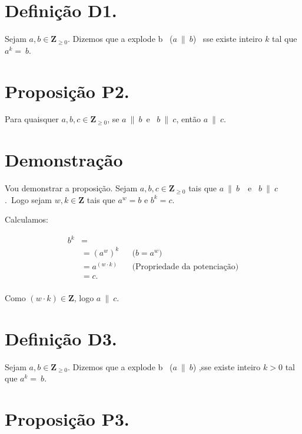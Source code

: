 \documentclass{article}
\def \aexpb{{$a\ \| \ b$}}
\def \bexpc{{$b\ \| \ c$}}
\def \aexpc{{$a\ \| \ c$}}
\begin{document}
 \newpage

 
\section{Definição D1.}
Sejam $a, b \in \mathbf Z _{\ge 0}$. Dizemos que a explode b \ (\aexpb) \ sse existe inteiro $k$ tal que $a^k=\ b$.

\section{Proposição P2.}

Para quaisquer $a,b,c \in \mathbf Z _{\ge 0}$, se \aexpb \ e  \ \bexpc , então \aexpc{}.


\section{Demonstração}

Vou demonstrar a proposição.\newline
Sejam $a,b,c \in \mathbf Z _{\ge 0}$ tais que \aexpb \ \ e \ \bexpc.\ Logo sejam $w,k \in \mathbf Z $ tais que $a^w=b$ e $b^k=c$.\newline

Calculamos:\newline



\begin{align*}
b^k& =
&& \text{}\\
& ={(a^w)}^k
&& \text{($b=a^w$)}\\
& = {a}^{(w \cdot k)}
&& \text{(Propriedade da potenciação)}\\
& = c.
&& \text{}\\
\end{align*}

Como ${(w \cdot k)} \in \mathbf Z$, logo \aexpc.  \RectangleBold

 \newpage

 
\section{Definição D3.}
Sejam $a, b \in \mathbf Z _{\ge 0}$. Dizemos que a explode b \ (\aexpb) ,sse existe inteiro $k > 0$ tal que $a^k=\ b$.

\section{Proposição P3.}
\end{document}
